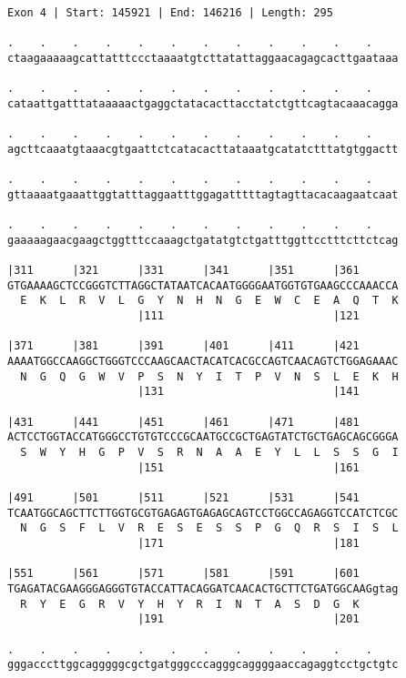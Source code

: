 \documentclass{article}
\begin{document}
\newpage
\begin{Verbatim}[fontfamily=courier]
Exon 4 | Start: 145921 | End: 146216 | Length: 295

.    .    .    .    .    .    .    .    .    .    .    .    
ctaagaaaaagcattatttccctaaaatgtcttatattaggaacagagcacttgaataaa

.    .    .    .    .    .    .    .    .    .    .    .    
cataattgatttataaaaactgaggctatacacttacctatctgttcagtacaaacagga

.    .    .    .    .    .    .    .    .    .    .    .    
agcttcaaatgtaaacgtgaattctcatacacttataaatgcatatctttatgtggactt

.    .    .    .    .    .    .    .    .    .    .    .    
gttaaaatgaaattggtatttaggaatttggagatttttagtagttacacaagaatcaat

.    .    .    .    .    .    .    .    .    .    .    .    
gaaaaagaacgaagctggtttccaaagctgatatgtctgatttggttcctttcttctcag

|311      |321      |331      |341      |351      |361      
GTGAAAAGCTCCGGGTCTTAGGCTATAATCACAATGGGGAATGGTGTGAAGCCCAAACCA
  E  K  L  R  V  L  G  Y  N  H  N  G  E  W  C  E  A  Q  T  K
                    |111                          |121      

|371      |381      |391      |401      |411      |421      
AAAATGGCCAAGGCTGGGTCCCAAGCAACTACATCACGCCAGTCAACAGTCTGGAGAAAC
  N  G  Q  G  W  V  P  S  N  Y  I  T  P  V  N  S  L  E  K  H
                    |131                          |141      

|431      |441      |451      |461      |471      |481      
ACTCCTGGTACCATGGGCCTGTGTCCCGCAATGCCGCTGAGTATCTGCTGAGCAGCGGGA
  S  W  Y  H  G  P  V  S  R  N  A  A  E  Y  L  L  S  S  G  I
                    |151                          |161      

|491      |501      |511      |521      |531      |541      
TCAATGGCAGCTTCTTGGTGCGTGAGAGTGAGAGCAGTCCTGGCCAGAGGTCCATCTCGC
  N  G  S  F  L  V  R  E  S  E  S  S  P  G  Q  R  S  I  S  L
                    |171                          |181      

|551      |561      |571      |581      |591      |601      
TGAGATACGAAGGGAGGGTGTACCATTACAGGATCAACACTGCTTCTGATGGCAAGgtag
  R  Y  E  G  R  V  Y  H  Y  R  I  N  T  A  S  D  G  K      
                    |191                          |201      

.    .    .    .    .    .    .    .    .    .    .    .    
gggacccttggcagggggcgctgatgggcccagggcaggggaaccagaggtcctgctgtc

\end{Verbatim}
\end{document}
